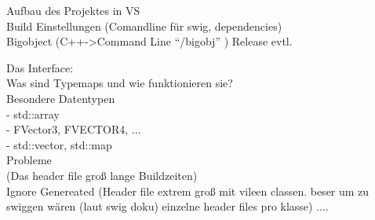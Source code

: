 Aufbau des Projektes in VS\\
Build Einstellungen (Comandline für swig, dependencies)\\
	Bigobject (C++->Command Line "`/bigobj"' )
	Release evtl.

Das Interface:\\
	Was sind Typemaps und wie funktionieren sie?\\
	Besondere Datentypen\\
		- std::array\\
		- FVector3, FVECTOR4, ...\\
		- std::vector, std::map\\
		
	Probleme\\
	(Das header file groß lange Buildzeiten)\\
	Ignore Genereated
	(Header file extrem groß  mit vileen classen. beser um zu swiggen wären (laut swig doku) einzelne header files pro klasse)
....
